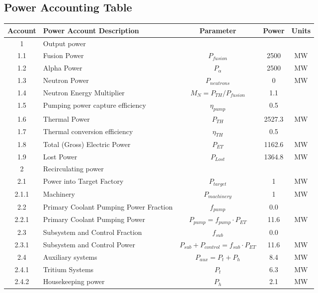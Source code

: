 \newpage
\subsection{Power Accounting Table}

\begin{table}[ht!]								
\centering								
\begin{tabular}{|c|p{5cm}|c|c|c|}								
\hline								
\textbf{Account}	&	\textbf{Power Account Description}	&	\textbf{Parameter }	&	\textbf{Power}	&	\textbf{Units} \\
\hline								
1	&	Output power	&		&		&	\\
\hline
1.1	&	Fusion Power	&	$P_{{fusion}}$	&	2500	&	MW \\
1.2	&	Alpha Power	&	$P_{{\alpha}}$	&	2500	&	MW \\
1.3	&	Neutron Power	&	$P_{{neutrons}}$	&	0	&	MW \\
1.4	&	Neutron Energy Multiplier	&	$M_N = P_{{TH}}/P_{{fusion}}$	&	1.1	&	\\
1.5	&	Pumping power capture efficiency	&	$\eta_{{pump}}$	&	0.5	&	\\
1.6	&	Thermal Power	&	$P_{{TH}}$	&	2527.3	&	MW \\
1.7	&	Thermal conversion efficiency	&	$\eta_{{TH}}$	&	0.5	&	\\
1.8	&	Total (Gross) Electric Power	&	$P_{{ET}}$	&	1162.6	&	MW \\
1.9	&	Lost Power	&	$P_{{Lost}}$	&	1364.8	&	MW \\
\hline								
2	&	Recirculating power	&		&		&	\\
\hline
2.1	&	Power into Target Factory 	&	$P_{target}$ &	1	&	MW \\
2.1.1	&	Machinery	&	$P_{machinery}$	&	1	&	MW \\
2.2	&	Primary Coolant Pumping Power Fraction	&	$f_{{pump}}$	&	0.0 &	\\
2.2.1	&	Primary Coolant Pumping Power	&	$P_{{pump}} = f_{{pump}} \cdot P_{{ET}}$	&	11.6	&	MW \\
2.3	&	Subsystem and Control Fraction	&	$f_{{sub}}$	&	0.0	&	\\
2.3.1	&	Subsystem and Control Power	&	$P_{{sub}} + P_{{control}} = f_{{sub}} \cdot P_{{ET}}$	&	11.6	&	MW \\
2.4	&	Auxiliary systems	&	$P_{{aux}} = P_{{t}} + P_{{h}}$	&	8.4	&	MW \\
2.4.1	&	Tritium Systems	&	$P_{{t}}$	&	6.3	&	MW \\
2.4.2	&	Housekeeping power	&	$P_{{h}}$	&	2.1	&	MW \\

\end{tabular}
\end{table}
